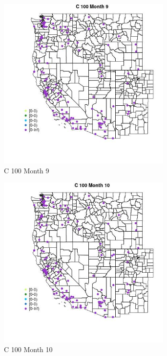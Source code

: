 \begin{figure} 
\centering  
\includegraphics[width=0.77\textwidth]{Code_Outputs/Report_ML_input_PM25_Step4_part_e_de_duplicated_aves_MapObsMo9C_100.jpg} 
\caption{\label{fig:Report_ML_input_PM25_Step4_part_e_de_duplicated_avesMapObsMo9C_100}C 100 Month 9} 
\end{figure} 
 

\begin{figure} 
\centering  
\includegraphics[width=0.77\textwidth]{Code_Outputs/Report_ML_input_PM25_Step4_part_e_de_duplicated_aves_MapObsMo10C_100.jpg} 
\caption{\label{fig:Report_ML_input_PM25_Step4_part_e_de_duplicated_avesMapObsMo10C_100}C 100 Month 10} 
\end{figure} 
 

